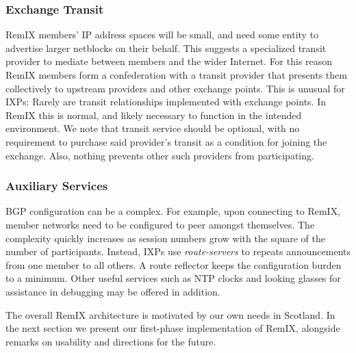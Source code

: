 \subsubsection{Exchange Transit}

RemIX members' IP address spaces will be small, and need some entity
to advertise larger netblocks on their behalf. This suggests a
specialized transit provider to mediate between members and the wider
Internet. For this reason RemIX members form a confederation with a
transit provider that presents them collectively to upstream providers
and other exchange points. This is unusual for \acp{IXP}: Rarely are
transit relationships implemented with exchange points. In RemIX this
is normal, and likely necessary to function in the intended
environment. We note that transit service should be optional,
with no requirement to purchase said provider's transit as a
condition for joining the exchange. Also, nothing prevents other such
providers from participating.

\subsubsection{Auxiliary Services}

\acs{BGP} configuration can be a complex. For example, upon connecting
to RemIX, member networks need to be configured to peer amongst
themselves. The complexity quickly increases as session numbers grow
with the square of the number of participants. Instead, \acp{IXP} use
\emph{route-servers} to repeats announcements from one member to all
others. A route reflector keeps the configuration burden to a minimum.
Other useful services such as \acs{NTP} clocks and looking glasses for
assistance in debugging may be offered in addition.


The overall RemIX architecture is motivated by our own needs in
Scotland. In the next section we present our first-phase
implementation of RemIX, alongside remarks on usability and directions
for the future.

